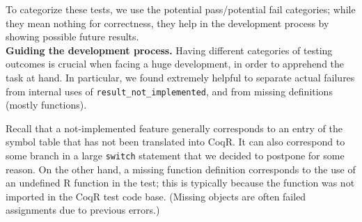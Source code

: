 \documentclass[
    sigplan,
    10pt,
    review, %
    natbib=false %
 ]{acmart}
\newcommand\td[1]{\todo[color=green!20,size=\scriptsize]{#1}}
\newcommand\CoqR{CoqR}
\begin{document}
%
%
To categorize these tests,
we use the \textsf{potential pass}/\textsf{potential fail} categories; while they mean nothing for correctness, they help in the development process by showing possible future results.\\



\noindent\textbf{Guiding the development process.}
Having different categories of testing outcomes is crucial when facing a huge development, in order to apprehend the task at hand. In particular, we found extremely helpful to separate actual failures from internal uses of \texttt{result_not_implemented}, and from missing definitions (mostly functions).

Recall that a not-implemented feature generally corresponds to an entry of the symbol table that has not been translated into \CoqR{}. It can also correspond to some branch in a large \texttt{switch} statement that we decided to postpone for some reason. On the other hand, a missing function definition corresponds to the use of an undefined R function in the test; this is typically because the function was not imported in the \CoqR{} test code base. (Missing objects are often failed assignments due to previous errors.)
\end{document}

